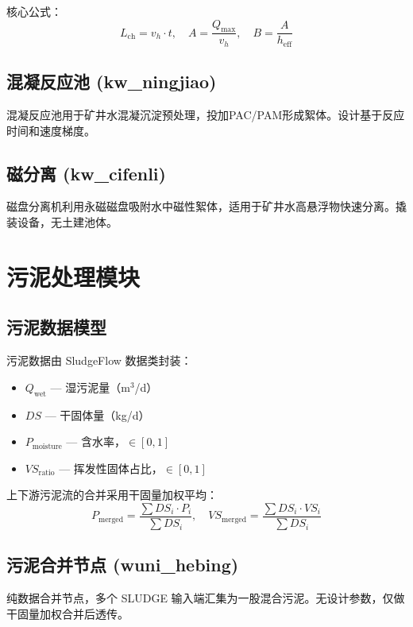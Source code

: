 \documentclass[12pt,a4paper]{ctexart}
\begin{document}
核心公式：
\begin{equation}
L_{\text{ch}} = v_h \cdot t, \quad A = \frac{Q_{\text{max}}}{v_h}, \quad B = \frac{A}{h_{\text{eff}}}
\end{equation}

\subsection{混凝反应池 (kw\_ningjiao)}
混凝反应池用于矿井水混凝沉淀预处理，投加PAC/PAM形成絮体。设计基于反应时间和速度梯度。

\subsection{磁分离 (kw\_cifenli)}
磁盘分离机利用永磁磁盘吸附水中磁性絮体，适用于矿井水高悬浮物快速分离。撬装设备，无土建池体。

\section{污泥处理模块}

\subsection{污泥数据模型}
污泥数据由 SludgeFlow 数据类封装：
\begin{itemize}
  \item $Q_{\text{wet}}$ — 湿污泥量（m$^3$/d）
  \item $DS$ — 干固体量（kg/d）
  \item $P_{\text{moisture}}$ — 含水率，$\in [0, 1]$
  \item $VS_{\text{ratio}}$ — 挥发性固体占比，$\in [0, 1]$
\end{itemize}

上下游污泥流的合并采用干固量加权平均：
\begin{equation}
P_{\text{merged}} = \frac{\sum DS_i \cdot P_i}{\sum DS_i}, \quad
VS_{\text{merged}} = \frac{\sum DS_i \cdot VS_i}{\sum DS_i}
\end{equation}

\subsection{污泥合并节点 (wuni\_hebing)}
纯数据合并节点，多个 SLUDGE 输入端汇集为一股混合污泥。无设计参数，仅做干固量加权合并后透传。
\end{document}
